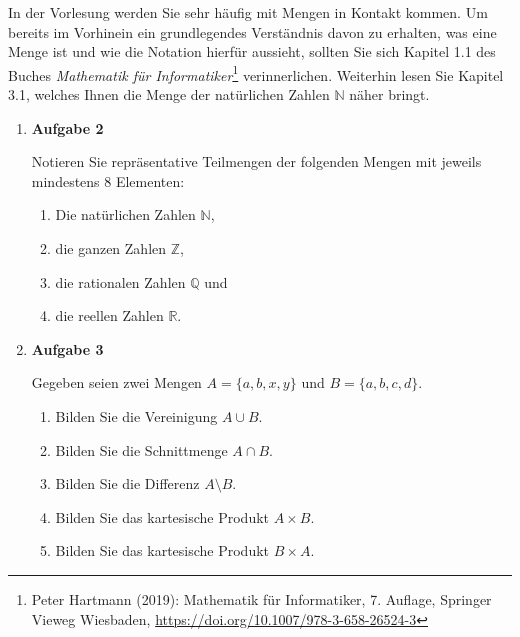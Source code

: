 \documentclass[a4paper,14pt,ngerman]{scrartcl}
\begin{document}
In der Vorlesung werden Sie sehr häufig mit Mengen in Kontakt kommen. Um
bereits im Vorhinein ein grundlegendes Verständnis davon zu erhalten,
was eine Menge ist und wie die Notation hierfür aussieht, sollten Sie
sich Kapitel 1.1 des Buches \emph{Mathematik für Informatiker}\footnote{Peter Hartmann (2019): Mathematik für Informatiker, 7. Auflage,
Springer Vieweg Wiesbaden,
\url{https://doi.org/10.1007/978-3-658-26524-3}}
verinnerlichen. Weiterhin lesen Sie Kapitel 3.1, welches Ihnen die Menge
der natürlichen Zahlen \(\mathbb{N}\) näher bringt.
\begin{enumerate}
\item \textbf{Aufgabe 2}
\label{sec:orgfc639b3}

Notieren Sie repräsentative Teilmengen der folgenden Mengen mit jeweils
mindestens 8 Elementen:

\begin{enumerate}
\item Die natürlichen Zahlen \(\mathbb{N}\),

\item die ganzen Zahlen \(\mathbb{Z}\),

\item die rationalen Zahlen \(\mathbb{Q}\) und

\item die reellen Zahlen \(\mathbb{R}\).
\end{enumerate}
\item \textbf{Aufgabe 3}
\label{sec:org1ff26e3}

Gegeben seien zwei Mengen \(A=\{a, b, x, y\}\) und \(B=\{a, b, c, d\}\).

\begin{enumerate}
\item Bilden Sie die Vereinigung \(A \cup B\).

\item Bilden Sie die Schnittmenge \(A \cap B\).

\item Bilden Sie die Differenz \(A \setminus B\).

\item Bilden Sie das kartesische Produkt \(A \times B\).

\item Bilden Sie das kartesische Produkt \(B \times A\).
\end{enumerate}
\end{enumerate}
\end{document}

